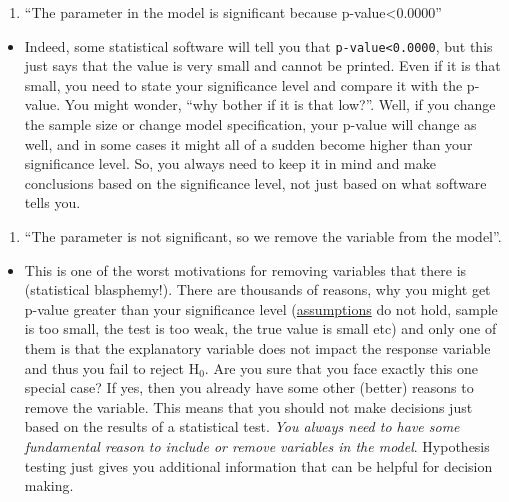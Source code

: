 \documentclass[
]{book}
\providecommand{\tightlist}{%
  \setlength{\itemsep}{0pt}\setlength{\parskip}{0pt}}
\theoremstyle{definition}
\theoremstyle{definition}
\theoremstyle{definition}
\theoremstyle{definition}
\theoremstyle{remark}
\begin{document}
\begin{enumerate}
\def\labelenumi{\arabic{enumi}.}
\setcounter{enumi}{4}
\tightlist
\item
  ``The parameter in the model is significant because p-value\textless0.0000''
\end{enumerate}

\begin{itemize}
\tightlist
\item
  Indeed, some statistical software will tell you that \texttt{p-value\textless{}0.0000}, but this just says that the value is very small and cannot be printed. Even if it is that small, you need to state your significance level and compare it with the p-value. You might wonder, ``why bother if it is that low?''. Well, if you change the sample size or change model specification, your p-value will change as well, and in some cases it might all of a sudden become higher than your significance level. So, you always need to keep it in mind and make conclusions based on the significance level, not just based on what software tells you.
\end{itemize}

\begin{enumerate}
\def\labelenumi{\arabic{enumi}.}
\setcounter{enumi}{5}
\tightlist
\item
  ``The parameter is not significant, so we remove the variable from the model''.
\end{enumerate}

\begin{itemize}
\tightlist
\item
  This is one of the worst motivations for removing variables that there is (statistical blasphemy!). There are thousands of reasons, why you might get p-value greater than your significance level (\hyperref[assumptions]{assumptions} do not hold, sample is too small, the test is too weak, the true value is small etc) and only one of them is that the explanatory variable does not impact the response variable and thus you fail to reject \(\mathrm{H}_0\). Are you sure that you face exactly this one special case? If yes, then you already have some other (better) reasons to remove the variable. This means that you should not make decisions just based on the results of a statistical test. \emph{You always need to have some fundamental reason to include or remove variables in the model}. Hypothesis testing just gives you additional information that can be helpful for decision making.
\end{itemize}
\end{document}
